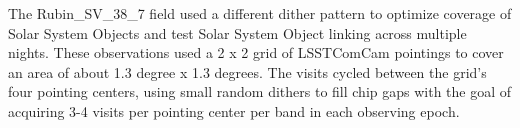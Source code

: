 The Rubin\_SV\_38\_7 field used a different dither pattern to optimize coverage of Solar System Objects and test Solar System \gls{Object} linking across multiple nights.
These observations used a 2 x 2 grid of \gls{LSSTComCam} pointings to cover an area of about 1.3 degree x 1.3 degrees.
The visits cycled between the grid’s four pointing centers, using small random dithers to fill chip gaps with the goal of acquiring 3-4 visits per pointing center per band in each observing \gls{epoch}.





